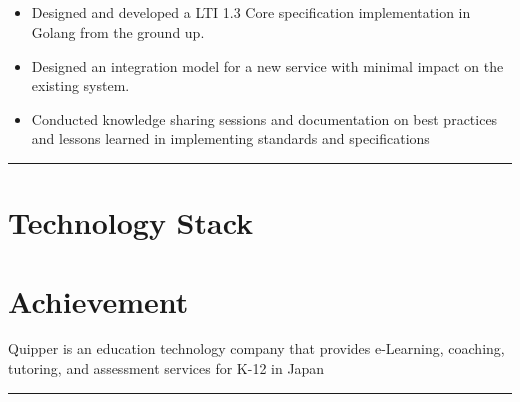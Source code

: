 \documentclass[12pt]{res} %
\begin{document}
\begin{resume}
\begin{multicols}{2}
	\section{}
		\begin{itemize}
			\setlength{\itemindent}{0pt}
			\item Designed and developed a LTI 1.3 Core specification implementation in Golang from the ground up.
			\item Designed an integration model for a new service with minimal impact on the existing system.
			\item Conducted knowledge sharing sessions and documentation on best practices and lessons learned in implementing standards and specifications
		\end{itemize}
\end{multicols}

\vspace{-20pt}
\begin{minipage}[t]{0.55\linewidth}
	\rule{0.25\textwidth}{2pt}
	\begin{multicols}{2}
		\section{Technology Stack}
		\columnbreak
		\section{}
	\end{multicols}
	\vspace{1pt}
\end{minipage}
\hfill
\begin{minipage}[t]{0.42\linewidth}
	\vspace{18pt}
	\section{Achievement}
	\begin{flushleft}
		Quipper is an education technology company that provides e-Learning, coaching, 
		tutoring, and assessment services for K-12 in Japan
	\end{flushleft}
\end{minipage}

\vspace{10pt}
\rule{1.0\textwidth}{0.1pt}


\end{resume}
\end{document}

